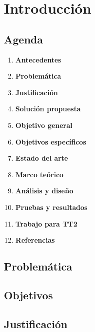 \chapter{Introducción}



\section{Agenda}

\begin{multicols}{2}

	\begin{enumerate}

		\item \textbf{Antecedentes}
		\item \textbf{Problemática}
		\item \textbf{Justificación}
		\item \textbf{Solución propuesta}
		\item \textbf{Objetivo general}
		\item \textbf{Objetivos específicos}
		\item \textbf{Estado del arte}
		\item \textbf{Marco teórico}
		\item \textbf{Análisis y diseño}
		\item \textbf{Pruebas y resultados}
		\item \textbf{Trabajo para TT2}
		\item \textbf{Referencias}

	\end{enumerate}

\end{multicols}


\section{Problemática}


\section{Objetivos}


\section{Justificación}
